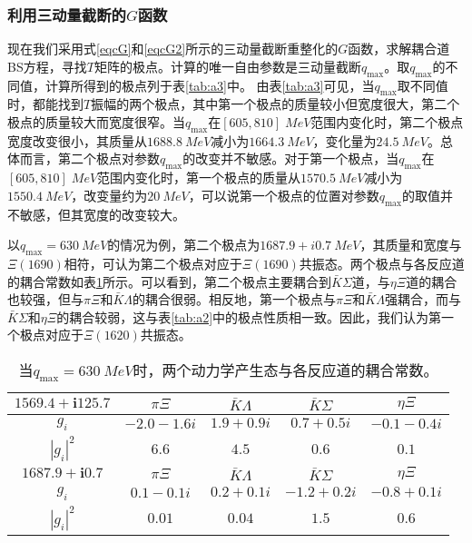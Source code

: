 \subsubsection{利用三动量截断的$G$函数}
现在我们采用式\eqref{eqcG}和\eqref{eqcG2}所示的三动量截断重整化的$G$函数，求解耦合道BS方程，寻找$T$矩阵的极点。计算的唯一自由参数是三动量截断$q_{\text{max}}$。取$q_{\text{max}}$的不同值，计算所得到的极点列于表\ref{tab:a3}中。
由表\ref{tab:a3}可见，当$q_{\text{max}}$取不同值时，都能找到$T$振幅的两个极点，其中第一个极点的质量较小但宽度很大，第二个极点的质量较大而宽度很窄。当$q_{\text{max}}$在$[605,810]\;\si{MeV}$范围内变化时，第二个极点宽度改变很小，其质量从$\SI{1688.8}{MeV}$减小为$\SI{1664.3}{MeV}$，变化量为$\SI{24.5}{MeV}$。总体而言，第二个极点对参数$q_{\text{max}}$的改变并不敏感。对于第一个极点，当$q_{\text{max}}$在$[605,810]\;\si{MeV}$范围内变化时，第一个极点的质量从$\SI{1570.5}{MeV}$减小为$\SI{1550.4}{MeV}$，改变量约为$\SI{20}{MeV}$，可以说第一个极点的位置对参数$q_{\text{max}}$的取值并不敏感，但其宽度的改变较大。\par
以$q_{\text{max}}=\SI{630}{MeV}$的情况为例，第二个极点为$1687.9+i\SI{0.7}{MeV}$，其质量和宽度与$\Xi(1690)$相符，可认为第二个极点对应于$\Xi(1690)$共振态。两个极点与各反应道的耦合常数如表\ref{tab:a4}所示。可以看到，第二个极点主要耦合到$\bar{K}\Sigma$道，与$\eta\Xi$道的耦合也较强，但与$\pi\Xi$和$\bar{K}\Lambda$的耦合很弱。相反地，第一个极点与$\pi\Xi$和$\bar{K}\Lambda$强耦合，而与$\bar{K}\Sigma$和$\eta\Xi$的耦合较弱，这与表\ref{tab:a2}中的极点性质相一致。因此，我们认为第一个极点对应于$\Xi(1620)$共振态。\par
\begin{table}[t]
	\caption[两个动力学产生态与各反应道的耦合常数]{当$q_{\text{max}}=\SI{630}{MeV}$时，两个动力学产生态与各反应道的耦合常数。}
\label{tab:a4}
\centering
\begin{spacing}{1.2}
\begin{tabular}{ccccc}
\hline\hline
   $ \bm{1569.4+i125.7}$ & $\pi \Xi$          & $\bar K\Lambda$        & $\bar K\Sigma$    & $\eta \Xi$ \\
   \hline
   $g_i$                   & $-2.0-1.6i$  & $1.9+0.9i$  & $0.7+0.5i$  & $-0.1-0.4i$ \\
   $|g_i|^2$               & $6.6$             & $4.5$            & $0.6$            & $0.1$ \\
   \hline\hline
   $\bm{1687.9 +i 0.7}$  & $\pi \Xi$          & $\bar K\Lambda$        & $\bar K\Sigma$    &$\eta \Xi$ \\
   \hline
   $g_i$                   & $0.1-0.1i$       & $0.2+0.1i$      & $-1.2+0.2i$   & $-0.8+0.1i$ \\
   $|g_i|^2$               & $0.01$             & $0.04$            & $1.5$            & $0.6$ \\
   \hline\hline
\end{tabular}
\end{spacing}
\end{table}
